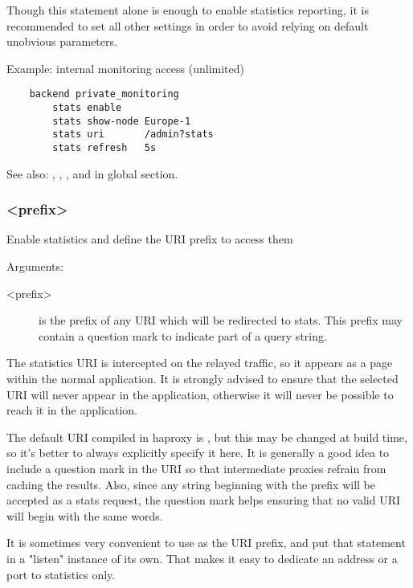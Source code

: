   Though this statement alone is enough to enable statistics reporting, it is
  recommended to set all other settings in order to avoid relying on default
  unobvious parameters.

  Example: internal monitoring access (unlimited)
  \begin{verbatim}
    backend private_monitoring
        stats enable
        stats show-node Europe-1
        stats uri       /admin?stats
        stats refresh   5s
  \end{verbatim}


See also: , , , and  in global
            section.

\subsubsection[stats uri]{ <prefix>}


  Enable statistics and define the URI prefix to access them


  Arguments:
  \begin{description}
  \item[<prefix>] is the prefix of any URI which will be redirected to stats. This
              prefix may contain a question mark  to indicate part of a
              query string.
  \end{description}

  The statistics URI is intercepted on the relayed traffic, so it appears as a
  page within the normal application. It is strongly advised to ensure that the
  selected URI will never appear in the application, otherwise it will never be
  possible to reach it in the application.

  The default URI compiled in haproxy is , but this may be
  changed at build time, so it's better to always explicitly specify it here.
  It is generally a good idea to include a question mark in the URI so that
  intermediate proxies refrain from caching the results. Also, since any string
  beginning with the prefix will be accepted as a stats request, the question
  mark helps ensuring that no valid URI will begin with the same words.

  It is sometimes very convenient to use \chr{/} as the URI prefix, and put that
  statement in a "listen" instance of its own. That makes it easy to dedicate
  an address or a port to statistics only.

